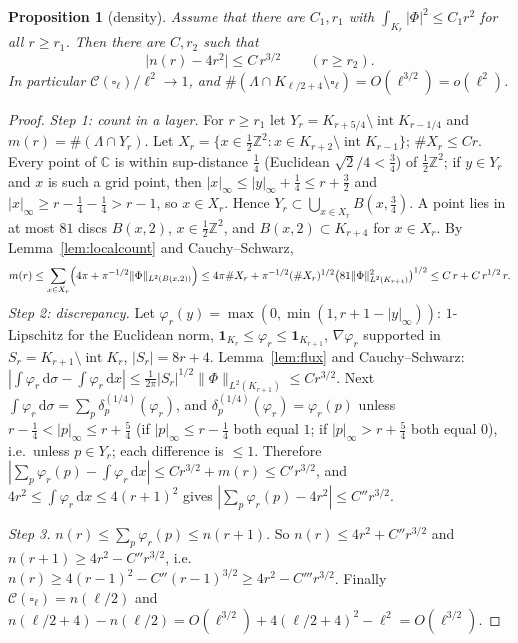 \documentclass[11pt]{article}
\newtheorem{proposition}[theorem]{Proposition}
\theoremstyle{definition}
\theoremstyle{remark}
\newcommand{\C}{\mathbb C}
\newcommand{\Z}{\mathbb Z}
\newcommand{\dd}{\,\mathrm d}
\newcommand{\Lam}{\Lambda}
\begin{document}
\begin{proposition}[density]\label{prop:density}
Assume that there are $C_1,r_1$ with $\int_{K_r}|\Phi|^2\le C_1r^2$ for all $r\ge r_1$.  Then there are $C,r_2$ such that
\[
\bigl|n(r)-4r^2\bigr|\le C\,r^{3/2}\qquad(r\ge r_2).
\]
In particular $\mathcal C(\square_\ell)/\ell^2\to1$, and $\#(\Lam\cap K_{\ell/2+4}\setminus\square_\ell)=O(\ell^{3/2})=o(\ell^2)$.
\end{proposition}
\begin{proof}
\emph{Step 1: count in a layer.}  For $r\ge r_1$ let $Y_r=K_{r+5/4}\setminus\operatorname{int}K_{r-1/4}$ and $m(r)=\#(\Lam\cap Y_r)$.  Let $X_r=\{x\in\frac12\Z^2:x\in K_{r+2}\setminus\operatorname{int}K_{r-1}\}$; $\#X_r\le Cr$.  Every point of $\C$ is within sup-distance $\frac14$ (Euclidean $\sqrt2/4<\frac34$) of $\frac12\Z^2$; if $y\in Y_r$ and $x$ is such a grid point, then $|x|_\infty\le|y|_\infty+\frac14\le r+\frac32$ and $|x|_\infty\ge r-\frac14-\frac14>r-1$, so $x\in X_r$.  Hence $Y_r\subset\bigcup_{x\in X_r}B(x,\frac34)$.  A point lies in at most $81$ discs $B(x,2)$, $x\in\frac12\Z^2$, and $B(x,2)\subset K_{r+4}$ for $x\in X_r$.  By Lemma~\ref{lem:localcount} and Cauchy--Schwarz,
\[
m(r)\le\sum_{x\in X_r}\Bigl(4\pi+\pi^{-1/2}\|\Phi\|_{L^2(B(x,2))}\Bigr)\le4\pi\#X_r+\pi^{-1/2}(\#X_r)^{1/2}\bigl(81\|\Phi\|^2_{L^2(K_{r+4})}\bigr)^{1/2}\le C\,r+C\,r^{1/2}\,r .
\]
\emph{Step 2: discrepancy.}  Let $\varphi_r(y)=\max(0,\min(1,r+1-|y|_\infty))$: $1$-Lipschitz for the Euclidean norm, $\mathbf 1_{K_r}\le\varphi_r\le\mathbf 1_{K_{r+1}}$, $\nabla\varphi_r$ supported in $S_r=K_{r+1}\setminus\operatorname{int}K_r$, $|S_r|=8r+4$.  Lemma~\ref{lem:flux} and Cauchy--Schwarz: $|\int\varphi_r\dd\sigma-\int\varphi_r\dd x|\le\frac1{2\pi}|S_r|^{1/2}\|\Phi\|_{L^2(K_{r+1})}\le Cr^{3/2}$.  Next $\int\varphi_r\dd\sigma=\sum_p\delta_p^{(1/4)}(\varphi_r)$, and $\delta_p^{(1/4)}(\varphi_r)=\varphi_r(p)$ unless $r-\frac14<|p|_\infty\le r+\frac54$ (if $|p|_\infty\le r-\frac14$ both equal $1$; if $|p|_\infty>r+\frac54$ both equal $0$), i.e.\ unless $p\in Y_r$; each difference is $\le1$.  Therefore $|\sum_p\varphi_r(p)-\int\varphi_r\dd x|\le Cr^{3/2}+m(r)\le C'r^{3/2}$, and $4r^2\le\int\varphi_r\dd x\le4(r+1)^2$ gives $|\sum_p\varphi_r(p)-4r^2|\le C''r^{3/2}$.

\emph{Step 3.}  $n(r)\le\sum_p\varphi_r(p)\le n(r+1)$.  So $n(r)\le4r^2+C''r^{3/2}$ and $n(r+1)\ge4r^2-C''r^{3/2}$, i.e.\ $n(r)\ge4(r-1)^2-C''(r-1)^{3/2}\ge4r^2-C'''r^{3/2}$.  Finally $\mathcal C(\square_\ell)=n(\ell/2)$ and $n(\ell/2+4)-n(\ell/2)=O(\ell^{3/2})+4(\ell/2+4)^2-\ell^2=O(\ell^{3/2})$.
\end{proof}
\end{document}

